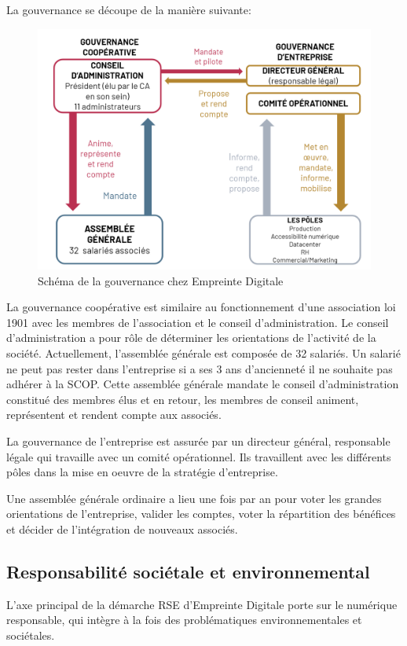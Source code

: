 \documentclass[12pt, a4paper, twoside]{article}
\begin{document}
\newpage
La gouvernance se découpe de la manière suivante:
\begin{figure}[!ht]
    \centering
    \includegraphics[width=\textwidth]{src/scheme_scop_ed.png}
    \caption{Schéma de la gouvernance chez Empreinte Digitale}
    \label{fig:gouvernance_ed}
\end{figure}

La gouvernance coopérative est similaire au fonctionnement d'une association loi 1901 avec les membres de l'association et le conseil d'administration. 
Le conseil d'administration a pour rôle de déterminer les orientations de l'activité de la société. 
Actuellement, l'assemblée générale est composée de 32 salariés. 
Un salarié ne peut pas rester dans l'entreprise si a ses 3 ans d'ancienneté il ne souhaite pas adhérer à la \gls{SCOP}. 
Cette assemblée générale mandate le conseil d'administration constitué des membres élus et en retour, les membres de conseil animent, représentent et rendent compte aux associés.

La gouvernance de l'entreprise est assurée par un directeur général, responsable légale qui travaille avec un comité opérationnel. 
Ils travaillent avec les différents pôles dans la mise en oeuvre de la stratégie d'entreprise.

Une assemblée générale ordinaire a lieu une fois par an pour voter les grandes orientations de l'entreprise, valider les comptes, voter la répartition des bénéfices et décider de l'intégration de nouveaux associés.

\subsection{Responsabilité sociétale et environnemental}
L'axe principal de la démarche \gls{RSE} d'Empreinte Digitale porte sur le numérique responsable, qui intègre à la fois des problématiques environnementales et sociétales.
\end{document}
